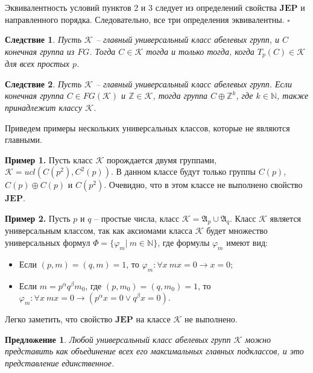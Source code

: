 \documentclass[a4paper,11pt,twoside]{article}
\newtheorem{proposition}{Предложение}[section]
\newtheorem{corollary}{Следствие}[section]
\def\A{{\mathfrak{A}}}
\def\K{{\mathcal{K}}}
\def\Z{{\mathbb{Z}}}
\def\N{{\mathbb{N}}}
\def\JEP{{\textbf{JEP}}}
\begin{document}
Эквивалентность условий пунктов 2 и 3 следует из определений свойства $\JEP$ и направленного порядка. Следовательно, все три определения эквивалентны. $\square$


\begin{corollary}\label{cor:MainClass1}
Пусть $\K$ -- главный универсальный класс абелевых групп, и $C$ конечная группа из $FG$. Тогда $C \in \K$ тогда и только тогда, когда $T_p(C) \in \K$ для всех простых $p$.
\end{corollary}

\begin{corollary}\label{cor:MainClass2}
Пусть $\K$ -- главный универсальный класс абелевых групп. Если конечная группа $C \in FG(\K)$ и $\Z \in \K$, тогда группа $C \oplus \Z^k$, где $k \in \N$, также принадлежит классу $\K$.
\end{corollary}

Приведем примеры нескольких универсальных классов, которые не являются главными.

\noindent \textbf{Пример 1.} Пусть класс $\K$ порождается двумя группами, $\K = ucl(C(p^2), C^2(p))$. В данном классе будут только группы $C(p)$, $C(p) \oplus C(p)$ и $C(p^2)$. Очевидно, что в этом классе не выполнено свойство $\JEP$.

\noindent \textbf{Пример 2.} Пусть $p$ и $q$ -- простые числа, класс $\K = \A_p \cup \A_q$. Класс $\K$ является универсальным классом, так как аксиомами класса $\K$ будет множество универсальных формул $\Phi = \{\varphi_m | \ m \in \N\}$, где формулы $\varphi_m$ имеют вид:
\begin{itemize}
 \item Если $(p,m)=(q,m)=1$, то $\varphi_m : \forall x \ mx = 0 \rightarrow x = 0$;
 \item Если $m = p^\alpha q^\beta m_0$, где $(p,m_0)=(q,m_0)=1$, то $\varphi_m : \forall x \ mx = 0 \rightarrow (p^\alpha x = 0 \vee q^\beta x = 0)$.
\end{itemize} 
Легко заметить, что свойство $\JEP$ на классе $\K$ не выполнено.


\begin{proposition}\label{prop:AnyClassIsUnionOfMainClasses}
Любой универсальный класс абелевых групп $\K$ можно представить как объединение всех его максимальных главных подклассов, и это представление единственное.
\end{proposition}
\end{document}
